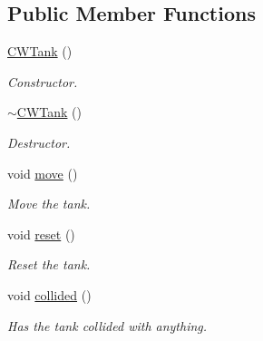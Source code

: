 \subsection*{Public Member Functions}
\begin{DoxyCompactItemize}
\item 
\mbox{\label{class_c_w_tank_a1bcbbdd9bac59a8ee2242ab45ab1ad2b}} 
\mbox{\hyperlink{class_c_w_tank_a1bcbbdd9bac59a8ee2242ab45ab1ad2b}{C\+W\+Tank}} ()
\begin{DoxyCompactList}\small\item\em Constructor. \end{DoxyCompactList}\item 
\mbox{\label{class_c_w_tank_a04b5e0c63fef1e451c1bc724d56f882b}} 
\mbox{\hyperlink{class_c_w_tank_a04b5e0c63fef1e451c1bc724d56f882b}{$\sim$\+C\+W\+Tank}} ()
\begin{DoxyCompactList}\small\item\em Destructor. \end{DoxyCompactList}\item 
\mbox{\label{class_c_w_tank_a9b4868441133922d291e7e869ccba78a}} 
void \mbox{\hyperlink{class_c_w_tank_a9b4868441133922d291e7e869ccba78a}{move}} ()
\begin{DoxyCompactList}\small\item\em Move the tank. \end{DoxyCompactList}\item 
\mbox{\label{class_c_w_tank_a8461e4aa3726689dd9e515ee68001804}} 
void \mbox{\hyperlink{class_c_w_tank_a8461e4aa3726689dd9e515ee68001804}{reset}} ()
\begin{DoxyCompactList}\small\item\em Reset the tank. \end{DoxyCompactList}\item 
\mbox{\label{class_c_w_tank_aeb13b5ea6112827346bbf4ea1cb9076b}} 
void \mbox{\hyperlink{class_c_w_tank_aeb13b5ea6112827346bbf4ea1cb9076b}{collided}} ()
\begin{DoxyCompactList}\small\item\em Has the tank collided with anything. \end{DoxyCompactList}\item 
\mbox{\label{class_c_w_tank_af70ef410d32daaf8e90a56a854cf6b4c}} 

\end{DoxyCompactItemize}
